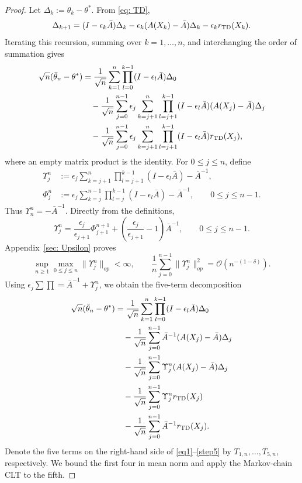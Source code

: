 \documentclass[11pt]{article}
\begin{document}
\begin{proof}
Let $\Delta_k:=\theta_k-\theta^*$. From \eqref{eq: TD},
\[
\Delta_{k+1}
=(I-\epsilon_k\bar A)\Delta_k
-\epsilon_k(A(X_k)-\bar A)\Delta_k
-\epsilon_k r_{\rm TD}(X_k).
\]
Iterating this recursion, summing over $k=1,\ldots,n$, and interchanging the
order of summation gives
\begin{align*}
\sqrt n(\bar\theta_n-\theta^*)
&=
\frac1{\sqrt n}\sum_{k=1}^n
\prod_{l=0}^{k-1}(I-\epsilon_l\bar A)\Delta_0\\
&\quad-
\frac1{\sqrt n}\sum_{j=0}^{n-1}
\epsilon_j\sum_{k=j+1}^n
\prod_{l=j+1}^{k-1}(I-\epsilon_l\bar A)
(A(X_j)-\bar A)\Delta_j\\
&\quad-
\frac1{\sqrt n}\sum_{j=0}^{n-1}
\epsilon_j\sum_{k=j+1}^n
\prod_{l=j+1}^{k-1}(I-\epsilon_l\bar A)
r_{\rm TD}(X_j),
\end{align*}
where an empty matrix product is the identity. For $0\leq j\leq n$, define
\begin{equation}\label{eq: def Upsilon}
\begin{split}
\Upsilon_j^n
&:=
\epsilon_j\sum_{k=j+1}^{n}
\prod_{l=j+1}^{k-1}(I-\epsilon_l\bar A)
-\bar A^{-1},\\
\Phi_j^n
&:=
\epsilon_j\sum_{k=j}^{n-1}
\prod_{l=j}^{k-1}(I-\epsilon_l\bar A)
-\bar A^{-1},
\qquad 0\leq j\leq n-1.
\end{split}
\end{equation}
Thus $\Upsilon_n^n=-\bar A^{-1}$. Directly from the definitions,
\begin{equation}\label{eq: correct Upsilon Phi identity}
    \Upsilon_j^n
    =
    \frac{\epsilon_j}{\epsilon_{j+1}}\Phi_{j+1}^{n+1}
    +
    \left(\frac{\epsilon_j}{\epsilon_{j+1}}-1\right)\bar A^{-1},
    \qquad 0\leq j\leq n-1.
\end{equation}
Appendix~\ref{sec: Upsilon} proves
\begin{equation}\label{eq: Upsilon-uniform-and-average}
    \sup_{n\geq1}\max_{0\leq j\leq n}\|\Upsilon_j^n\|_{op}<\infty,
    \qquad
    \frac1n\sum_{j=0}^{n-1}\|\Upsilon_j^n\|_{op}^2
    =
    \mathcal O\!\left(n^{-(1-\delta)}\right).
\end{equation}
Using $\epsilon_j\sum\prod=\bar A^{-1}+\Upsilon_j^n$, we obtain the five-term
decomposition
\begin{align}
\sqrt n(\bar\theta_n-\theta^*)
&=
\frac1{\sqrt n}\sum_{k=1}^{n}
\prod_{l=0}^{k-1}(I-\epsilon_l\bar A)\Delta_0
\label{eq1}\\
&\quad-
\frac1{\sqrt n}\sum_{j=0}^{n-1}
\bar A^{-1}(A(X_j)-\bar A)\Delta_j
\label{eq2}\\
&\quad-
\frac1{\sqrt n}\sum_{j=0}^{n-1}
\Upsilon_j^n(A(X_j)-\bar A)\Delta_j
\label{step3}\\
&\quad-
\frac1{\sqrt n}\sum_{j=0}^{n-1}
\Upsilon_j^n r_{\rm TD}(X_j)
\label{step4}\\
&\quad-
\frac1{\sqrt n}\sum_{j=0}^{n-1}
\bar A^{-1}r_{\rm TD}(X_j).
\label{step5}
\end{align}
Denote the five terms on the right-hand side of
\eqref{eq1}--\eqref{step5} by $T_{1,n},\ldots,T_{5,n}$, respectively. We
bound the first four in mean norm and apply the Markov-chain CLT to the fifth.


\end{proof}
\end{document}
